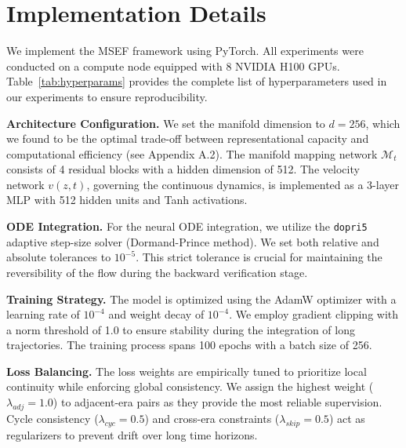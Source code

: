 \documentclass{article}
\begin{document}

\section{Implementation Details}
\label{app:impl}

We implement the MSEF framework using PyTorch. All experiments were conducted on a compute node equipped with 8 NVIDIA H100 GPUs. Table~\ref{tab:hyperparams} provides the complete list of hyperparameters used in our experiments to ensure reproducibility.

\textbf{Architecture Configuration.} We set the manifold dimension to $d=256$, which we found to be the optimal trade-off between representational capacity and computational efficiency (see Appendix A.2). The manifold mapping network $\mathcal{M}_t$ consists of 4 residual blocks with a hidden dimension of 512. The velocity network $v(z,t)$, governing the continuous dynamics, is implemented as a 3-layer MLP with 512 hidden units and Tanh activations.

\textbf{ODE Integration.} For the neural ODE integration, we utilize the \texttt{dopri5} adaptive step-size solver (Dormand-Prince method). We set both relative and absolute tolerances to $10^{-5}$. This strict tolerance is crucial for maintaining the reversibility of the flow during the backward verification stage.

\textbf{Training Strategy.} The model is optimized using the AdamW optimizer with a learning rate of $10^{-4}$ and weight decay of $10^{-4}$. We employ gradient clipping with a norm threshold of 1.0 to ensure stability during the integration of long trajectories. The training process spans 100 epochs with a batch size of 256.

\textbf{Loss Balancing.} The loss weights are empirically tuned to prioritize local continuity while enforcing global consistency. We assign the highest weight ($\lambda_{adj}=1.0$) to adjacent-era pairs as they provide the most reliable supervision. Cycle consistency ($\lambda_{cyc}=0.5$) and cross-era constraints ($\lambda_{skip}=0.5$) act as regularizers to prevent drift over long time horizons.
\end{document}
